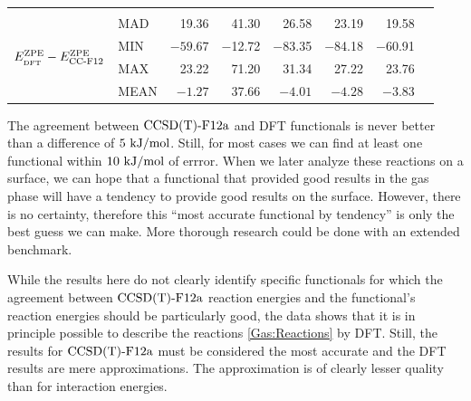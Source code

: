 \begin{table}[t!]
\begin{adjustbox}{width=1.0\textwidth,center}
\begin{tabular}{lll|lDDDDD|r}
     \hline \hline
      & & & & & & & & &  \\[-10pt]
       &
       MAD   & 19.36 & 41.30 & 26.58 & 23.19 & 19.58  &  \\
      & & & MIN   & $-59.67$ & $-$12.72 & $-$83.35 & $-$84.18 & $-$60.91 & \\
      & & & MAX   & 23.22 & 71.20 & 31.34 & 27.22 & 23.76  & \\
      & & & MEAN  & $-1.27$ & 37.66 & $-4.01$ & $-4.28$  & $-3.83$ \\[2pt]
    \end{tabular}%
  \label{Tab:Gas:Reactions}%
\end{adjustbox}
\end{table}%



The agreement between $\text{CCSD(T)-F12a}$ and DFT functionals is never better than a
difference of $5~\text {kJ/mol}$. Still, for most cases we can find at least one
functional within $10~\text {kJ/mol}$ of errror. When we later analyze these reactions on
a surface, we can hope that a functional that provided good results in the
gas phase will have a tendency to provide good results on the surface. However,
there is no certainty, therefore this ``most accurate functional by tendency'' is
only the best guess we can make. More thorough research could be done with
an extended benchmark.

While the results here do not clearly identify specific functionals for which
the agreement between \mbox{$\text{CCSD(T)-F12a}$} reaction energies and the functional's
reaction energies should be particularly good, the data shows that it
is in principle possible to describe the reactions \eqref{Gas:Reactions} by
DFT.
Still, the results for $\text{CCSD(T)-F12a}$ must be considered the most accurate
and the DFT results are mere approximations. The approximation is of
clearly lesser quality than for interaction energies.

